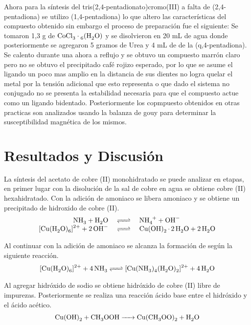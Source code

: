 \documentclass[fleqn,10pt]{SelfArx} %
\begin{document}
	Ahora para la síntesis del tris(2,4-pentadionato)cromo(III) a falta de (2,4-pentadiona) se utilizo (1,4-pentadiona) lo que altero las características del compuesto obtenido sin embargo el proceso de preparación fue el siguiente: Se tomaron 1,3 g de  $\ce{CoCl_{3} \cdot 6(H_{2}O)}$ y se disolvieron en 20 mL de agua donde posteriormente se agregaron 5 gramos de Urea y 4 mL de de la (q,4-pentadiona). Se calento durante una ahora a reflujo y se obtuvo un compuesto marrón claro pero no se obtuvo el precipitado café rojizo esperado, por lo que se asume el ligando un poco mas amplio en la distancia de sus dientes no logra quelar el metal por la tensión adicional que esto representa o que dado el sistema no conjugado no se presenta la estabilidad necesaria para que el compuesto actue como un ligando bidentado.
	Posteriormente los copmpuesto obtenidos en otras practicas son analizados usando la balanza de gouy para determinar la susceptibilidad magnética de los mismos.
	

	\section{Resultados y Discusi\'on}
	La s\'intesis del acetato de cobre (II) monohidratado se puede analizar en etapas, en primer lugar con la disoluci\'on de la sal de cobre en agua se obtiene cobre (II) hexahidratado. Con la adici\'on de amoniaco se libera amoniaco y se obtiene un precipitado de hidroxido de cobre (II).
	\footnotesize
	\begin{equation}
	    \begin{array}{rcl}
	        \ce{NH3 + H2O} & \ce{<=>} & \ce{NH4+ + OH-} \\
	        \ce{[Cu(H2O)6]^{2+} + 2OH-} & \ce{<=>} & \ce{Cu(OH)2.2H2O + 2H2O} 
	    \end{array}
	\end{equation}
	\normalsize
	
	Al continuar con la adici\'on de amoniaco se alcanza la formaci\'on de  seg\'un la siguiente reacci\'on.
	\footnotesize
	\begin{equation}
	    \ce{[Cu(H2O)6]^{2+} + 4NH3 <=> [Cu(NH3)4(H2O)2]^{2+} + 4H2O}
	\end{equation}
	\normalsize
	
	Al agregar hidr\'oxido de sodio se obtiene hidr\'oxido de cobre (II) libre de impurezas. Posteriormente se realiza una reacci\'on \'acido base entre el hidr\'oxido y el \'acido ac\'etico.
	\begin{equation}
	    \ce{Cu(OH)2 + CH3OOH -> Cu(CH3OO)2 + H2O}
	\end{equation}
	
\end{document}
